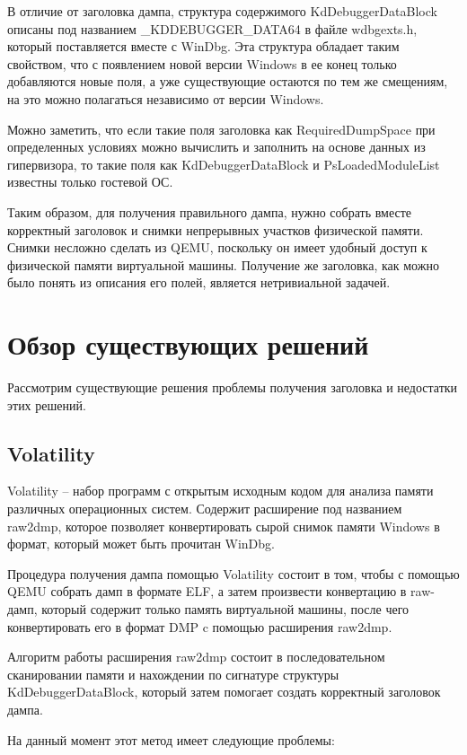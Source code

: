 \documentclass{mipt-thesis-bs}
\begin{document}
В отличие от заголовка дампа, структура содержимого KdDebuggerDataBlock описаны под названием {\_}KDDEBUGGER{\_}DATA64 в файле wdbgexts.h, который поставляется вместе с WinDbg. Эта структура обладает таким свойством, что с появлением новой версии Windows в ее конец только добавляются новые поля, а уже существующие остаются по тем же смещениям, на это можно полагаться независимо от версии Windows.

Можно заметить, что если такие поля заголовка как RequiredDumpSpace при определенных условиях можно вычислить и заполнить на основе данных из гипервизора, то такие поля как KdDebuggerDataBlock и PsLoadedModuleList известны только гостевой ОС.

Таким образом, для получения правильного дампа, нужно собрать вместе корректный заголовок и снимки непрерывных участков физической памяти. Снимки несложно сделать из QEMU, поскольку он имеет удобный доступ к физической памяти виртуальной машины. Получение же заголовка, как можно было понять из описания его полей, является нетривиальной задачей.

\chapter{Обзор существующих решений}

Рассмотрим существующие решения проблемы получения заголовка и недостатки этих решений.

\section*{Volatility}

Volatility -- набор программ с открытым исходным кодом для анализа памяти различных операционных систем. Содержит расширение под названием raw2dmp, которое позволяет конвертировать сырой снимок памяти Windows в формат, который может быть прочитан WinDbg.

Процедура получения дампа помощью Volatility состоит в том, чтобы с помощью QEMU собрать дамп в формате ELF, а затем произвести конвертацию в raw-дамп, который содержит только память виртуальной машины, после чего конвертировать его в формат DMP c помощью расширения raw2dmp\cite{lpblog}.

Алгоритм работы расширения raw2dmp состоит в последовательном сканировании памяти и нахождении по сигнатуре структуры KdDebuggerDataBlock, который затем помогает создать корректный заголовок дампа.

На данный момент этот метод имеет следующие проблемы:
\end{document}
